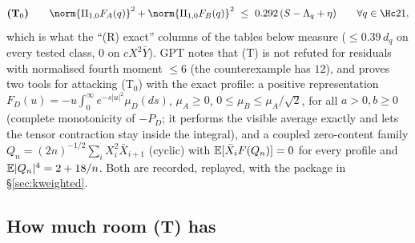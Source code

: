 \[
\textbf{(T$_0$)}\qquad \norm{\Pi_{1,0}F_A(q)}^2+\norm{\Pi_{1,0}F_B(q)}^2\ \le\ 0.292\,(S-\Lambda_q+\eta)\qquad\forall q\in\Hc21 ,
\]
which is what the ``(R) exact'' columns of the tables below measure ($\le0.39\,d_q$ on every tested class, $0$ on $cX^2\bar Y$). GPT notes that (T) is not refuted for residuals with normalised
fourth moment $\le6$ (the counterexample has $12$), and proves two tools for attacking (T$_0$) with the exact profile: a positive representation $F_D(u)=-u\int_0^\infty e^{-s|u|^2}\mu_D(ds)$,
$\mu_A\ge0$, $0\le\mu_B\le\mu_A/\sqrt2$, for all $a>0,b\ge0$ (complete monotonicity of $-P_D$; it performs the visible average exactly and lets the tensor contraction stay inside the
integral), and a coupled zero-content family $Q_n=(2n)^{-1/2}\sum_iX_i^2\bar X_{i+1}$ (cyclic) with $\mathbb E[\bar X_iF(Q_n)]=0$ for every profile and $\mathbb E|Q_n|^4=2+18/n$. Both are recorded, replayed, with the
package in \S\ref{sec:kweighted}.

\subsection{How much room (T) has}\label{sec:wct-numerics}

